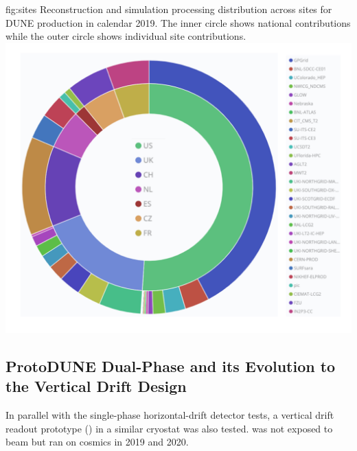 \documentclass[../main-v1.tex]{subfiles}
\begin{document}
\begin{dunefigure}
{fig:sites} %
{Reconstruction and simulation processing distribution across sites for DUNE production in calendar 2019.  The inner circle shows national contributions while the outer circle shows individual site contributions.}
\includegraphics[height=0.65\textwidth]{graphics/IntroFigures/Fig_8.pdf}
\end{dunefigure}

\subsection{ProtoDUNE Dual-Phase and its Evolution to the Vertical Drift Design }


In parallel with the single-phase horizontal-drift detector tests, a vertical drift   readout prototype ()
in a similar cryostat was also  tested.   was not exposed to beam but ran on cosmics in 2019 and 2020. 
\end{document}
